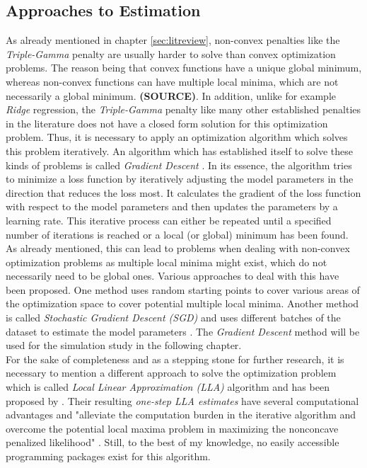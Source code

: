 \documentclass[12pt,a4paper]{article}
\begin{document}
\subsection{Approaches to Estimation}
As already mentioned in chapter \ref{sec:litreview}, non-convex penalties like the \textit{Triple-Gamma} penalty are usually harder to solve than convex optimization problems. The reason being that convex functions have a unique global minimum, whereas non-convex functions can have multiple local minima, which are not necessarily a global minimum. \textbf{(SOURCE)}. In addition, unlike for example \textit{Ridge} regression, the \textit{Triple-Gamma} penalty like many other established penalties in the literature does not have a closed form solution for this optimization problem. Thus, it is necessary to apply an optimization algorithm which solves this problem iteratively. An algorithm which has established itself to solve these kinds of problems is called \textit{Gradient Descent} \parencite[229--248]{GrippoSciandrone2023}. In its essence, the algorithm tries to minimize a loss function by iteratively adjusting the model parameters in the direction that reduces the loss most. It calculates the gradient of the loss function with respect to the model parameters and then updates the parameters by a learning rate. This iterative process can either be repeated until a specified number of iterations is reached or a local (or global) minimum has been found. As already mentioned, this can lead to problems when dealing with non-convex optimization problems as multiple local minima might exist, which do not necessarily need to be global ones. Various approaches to deal with this have been proposed. One method uses random starting points to cover various areas of the optimization space to cover potential multiple local minima. Another method is called \textit{Stochastic Gradient Descent (SGD)} and uses different batches of the dataset to estimate the model parameters \parencite{Amari1993}. The \textit{Gradient Descent} method will be used for the simulation study in the following chapter.\\

For the sake of completeness and as a stepping stone for further research, it is necessary to mention a different approach to solve the optimization problem which is called \textit{Local Linear Approximation (LLA)} algorithm and has been proposed by \textcite{ZouLi2008}. Their resulting \textit{one-step LLA estimates} have several computational advantages and "alleviate the computation burden in the iterative algorithm and overcome the potential local maxima problem in maximizing the nonconcave penalized likelihood" \parencite{ZouLi2008}. Still, to the best of my knowledge, no easily accessible programming packages exist for this algorithm.
\end{document}
